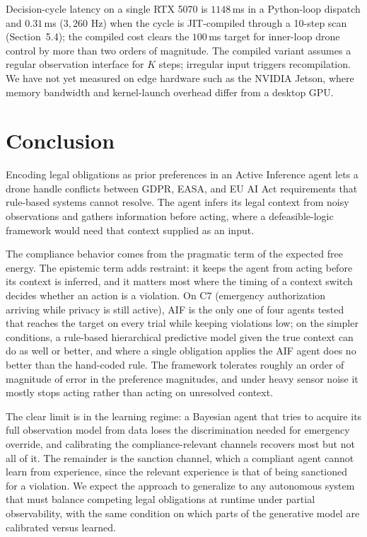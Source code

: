 \documentclass[10pt,twocolumn]{article}
\begin{document}
Decision-cycle latency on a single RTX 5070 is $1148\,$ms in a Python-loop dispatch and $0.31\,$ms ($3{,}260$ Hz) when the cycle is JIT-compiled through a 10-step scan (Section~5.4); the compiled cost clears the $100\,$ms target for inner-loop drone control by more than two orders of magnitude. The compiled variant assumes a regular observation interface for $K$ steps; irregular input triggers recompilation. We have not yet measured on edge hardware such as the NVIDIA Jetson, where memory bandwidth and kernel-launch overhead differ from a desktop GPU.


\section{Conclusion}

Encoding legal obligations as prior preferences in an Active Inference agent lets a drone handle conflicts between GDPR, EASA, and EU AI Act requirements that rule-based systems cannot resolve. The agent infers its legal context from noisy observations and gathers information before acting, where a defeasible-logic framework would need that context supplied as an input.

The compliance behavior comes from the pragmatic term of the expected free energy. The epistemic term adds restraint: it keeps the agent from acting before its context is inferred, and it matters most where the timing of a context switch decides whether an action is a violation. On C7 (emergency authorization arriving while privacy is still active), AIF is the only one of four agents tested that reaches the target on every trial while keeping violations low; on the simpler conditions, a rule-based hierarchical predictive model given the true context can do as well or better, and where a single obligation applies the AIF agent does no better than the hand-coded rule. The framework tolerates roughly an order of magnitude of error in the preference magnitudes, and under heavy sensor noise it mostly stops acting rather than acting on unresolved context.

The clear limit is in the learning regime: a Bayesian agent that tries to acquire its full observation model from data loses the discrimination needed for emergency override, and calibrating the compliance-relevant channels recovers most but not all of it. The remainder is the sanction channel, which a compliant agent cannot learn from experience, since the relevant experience is that of being sanctioned for a violation. We expect the approach to generalize to any autonomous system that must balance competing legal obligations at runtime under partial observability, with the same condition on which parts of the generative model are calibrated versus learned.
\end{document}
